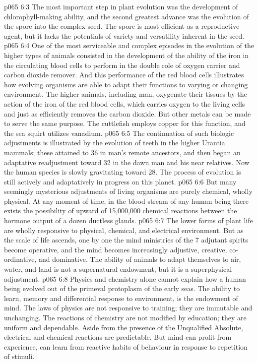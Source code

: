\vs p065 6:3 The most important step in plant evolution was the development of chlorophyll\hyp{}making ability, and the second greatest advance was the evolution of the spore into the complex seed. The spore is most efficient as a reproductive agent, but it lacks the potentials of variety and versatility inherent in the seed.
\vs p065 6:4 One of the most serviceable and complex episodes in the evolution of the higher types of animals consisted in the development of the ability of the iron in the circulating blood cells to perform in the double role of oxygen carrier and carbon dioxide remover. And this performance of the red blood cells illustrates how evolving organisms are able to adapt their functions to varying or changing environment. The higher animals, including man, oxygenate their tissues by the action of the iron of the red blood cells, which carries oxygen to the living cells and just as efficiently removes the carbon dioxide. But other metals can be made to serve the same purpose. The cuttlefish employs copper for this function, and the sea squirt utilizes vanadium.
\vs p065 6:5 The continuation of such biologic adjustments is illustrated by the evolution of teeth in the higher Urantia mammals; these attained to 36 in man’s remote ancestors, and then began an adaptative readjustment toward 32 in the dawn man and his near relatives. Now the human species is slowly gravitating toward 28. The process of evolution is still actively and adaptatively in progress on this planet.
\vs p065 6:6 But many seemingly mysterious adjustments of living organisms are purely chemical, wholly physical. At any moment of time, in the blood stream of any human being there exists the possibility of upward of 15,000,000 chemical reactions between the hormone output of a dozen ductless glands.
\vs p065 6:7 \pc The lower forms of plant life are wholly responsive to physical, chemical, and electrical environment. But as the scale of life ascends, one by one the mind ministries of the 7 adjutant spirits become operative, and the mind becomes increasingly adjustive, creative, co\hyp{}ordinative, and dominative. The ability of animals to adapt themselves to air, water, and land is not a supernatural endowment, but it is a superphysical adjustment.
\vs p065 6:8 Physics and chemistry alone cannot explain how a human being evolved out of the primeval protoplasm of the early seas. The ability to learn, memory and differential response to environment, is the endowment of mind. The laws of physics are not responsive to training; they are immutable and unchanging. The reactions of chemistry are not modified by education; they are uniform and dependable. Aside from the presence of the Unqualified Absolute, electrical and chemical reactions are predictable. But mind can profit from experience, can learn from reactive habits of behaviour in response to repetition of stimuli.
